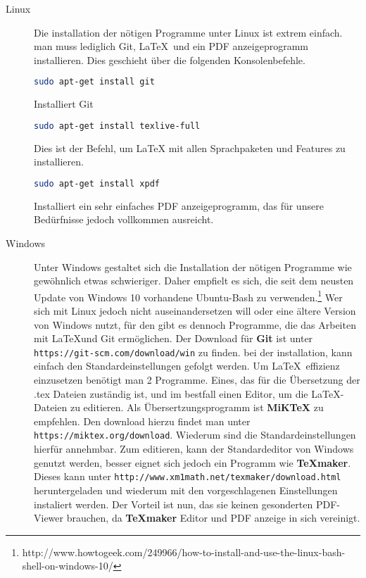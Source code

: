 \documentclass[12pt,a4paper]{scrartcl}
\begin{document}
\begin{description}
\item[Linux]
Die installation der nötigen Programme unter Linux ist extrem einfach. man muss lediglich Git, \LaTeX \ und ein PDF anzeigeprogramm installieren. Dies geschieht über die folgenden Konsolenbefehle.
\begin{lstlisting}[language=bash]
sudo apt-get install git
\end{lstlisting}
Installiert Git
\begin{lstlisting}[language=bash]
sudo apt-get install texlive-full 
\end{lstlisting}
Dies ist der Befehl, um LaTeX mit allen Sprachpaketen und Features zu installieren.
\begin{lstlisting}[language=bash]
sudo apt-get install xpdf
\end{lstlisting}
Installiert ein sehr einfaches PDF anzeigeprogramm, das für unsere Bedürfnisse jedoch vollkommen ausreicht.


\item[Windows]
Unter Windows gestaltet sich die Installation der nötigen Programme wie gewöhnlich etwas schwieriger. Daher empfielt es sich, die seit dem neusten Update von Windows 10 vorhandene Ubuntu-Bash zu verwenden.\footnote{http://www.howtogeek.com/249966/how-to-install-and-use-the-linux-bash-shell-on-windows-10/} Wer sich mit Linux jedoch nicht auseinandersetzen will oder eine ältere Version von Windows nutzt, für den gibt es dennoch Programme, die das Arbeiten mit \LaTeX und Git ermöglichen. Der Download für \textbf{Git} ist unter \verb+https://git-scm.com/download/win+ zu finden. bei der installation, kann einfach den Standardeinstellungen gefolgt werden. Um \LaTeX \ effizienz einzusetzen benötigt man 2 Programme. Eines, das für die Übersetzung der .tex Dateien zuständig ist, und im bestfall einen Editor, um die \LaTeX -Dateien zu editieren. Als Übersertzungsprogramm ist \textbf{MiKTeX} zu empfehlen. Den download hierzu findet man unter \verb+https://miktex.org/download+. Wiederum sind die Standardeinstellungen hierfür annehmbar. Zum editieren, kann der Standardeditor von Windows genutzt werden, besser eignet sich jedoch ein Programm wie \textbf{TeXmaker}. Dieses kann unter \verb+http://www.xm1math.net/texmaker/download.html+ heruntergeladen und wiederum mit den vorgeschlagenen Einstellungen instaliert werden. Der Vorteil ist nun, das sie keinen gesonderten PDF-Viewer brauchen, da \textbf{TeXmaker} Editor und PDF anzeige in sich vereinigt.
\end{description}
\end{document}
